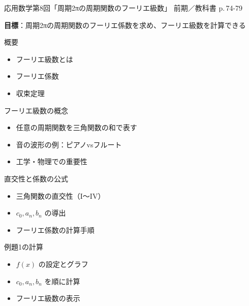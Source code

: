 \documentclass[aspectratio=43,professionalfonts,handout]{beamer}
\newcommand{\LectureNum}{8}
\newcommand{\LectureTitle}{周期2πの周期関数のフーリエ級数}
\newcommand{\TextPages}{p.\,74-79}
\newcommand{\CourseName}{応用数学}
\renewcommand{\TermName}{前期}
\begin{document}
\begin{frame}{\CourseName\quad 第\LectureNum 回「\LectureTitle」}
  {\small \TermName\quad \TeacherName\quad ／\quad 教科書 \TextPages}

  \textbf{目標}：周期2πの周期関数のフーリエ係数を求め、フーリエ級数を計算できる

  \begin{block}{概要}
  \begin{itemize}
    \item フーリエ級数とは
    \item フーリエ係数
    \item 収束定理
  \end{itemize}
  \end{block}
\end{frame}

\begin{frame}{フーリエ級数の概念}
  \begin{block}{}
  \begin{itemize}
    \item 任意の周期関数を三角関数の和で表す
    \item 音の波形の例：ピアノvsフルート
    \item 工学・物理での重要性
  \end{itemize}
  \end{block}
\end{frame}

\begin{frame}{直交性と係数の公式}
  \begin{block}{}
  \begin{itemize}
    \item 三角関数の直交性（I〜IV）
    \item $c_{0}, a_{n}, b_{n}$ の導出
    \item フーリエ係数の計算手順
  \end{itemize}
  \end{block}
\end{frame}

\begin{frame}{例題1の計算}
  \begin{block}{}
  \begin{itemize}
    \item $f(x)$ の設定とグラフ
    \item $c_{0}, a_{n}, b_{n}$ を順に計算
    \item フーリエ級数の表示
  \end{itemize}
  \end{block}
\end{frame}
\end{document}
